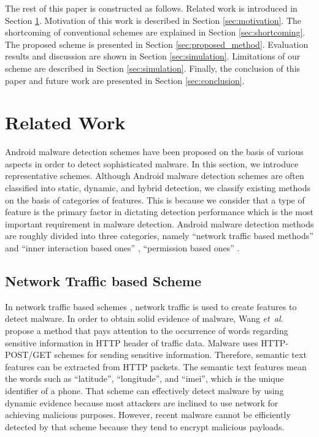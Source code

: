 \documentclass{ieeeaccess}
\newcommand{\etal}{\textit{et~al.}}
\begin{document}
The rest of this paper is constructed as follows. 
Related work is introduced in Section \ref{sec:related_work}.
Motivation of this work is described in Section \ref{sec:motivation}.
The shortcoming of conventional schemes are explained in Section \ref{sec:shortcoming}.
The proposed scheme is presented in Section \ref{sec:proposed_method}.
Evaluation results and discussion are shown in Section \ref{sec:simulation}.
Limitations of our scheme are described in Section \ref{sec:simulation}.
Finally, the conclusion of this paper and future work are presented in Section \ref{sec:conclusion}.

\section{Related Work} \label{sec:related_work}
Android malware detection schemes have been proposed on the basis of various aspects in order to detect sophisticated malware.
In this section, we introduce representative schemes.
Although Android malware detection schemes are often classified into static, dynamic, and hybrid detection, we classify existing methods on the basis of categories of features.
This is because we consider that a type of feature is the primary factor in dictating detection performance which is the most important requirement in malware detection.
Android malware detection methods are roughly divided into three categories, namely ``network traffic based methods'' \cite{wang2018detecting,garg2017network} and ``inner interaction based ones'' \cite{aafer2013droidapiminer, deshotels2014droidlegacy, xu2016iccdetector, cai2018droidcat}, ``permission based ones''  \cite{sanz2013puma, li2018significant, liang2014permission, liu2014two, arora2019permpair}.

\subsection{Network Traffic based Scheme}
In network traffic based schemes \cite{wang2018detecting,garg2017network}, network traffic is used to create features to detect malware.
In order to obtain solid evidence of malware, Wang \etal \cite{wang2018detecting} propose a method that pays attention to the occurrence of words regarding sensitive information in HTTP header of traffic data.
Malware uses HTTP-POST/GET schemes for sending sensitive information.
Therefore, semantic text features can be extracted from HTTP packets. 
The semantic text features mean the words such as ``latitude'', ``longitude'', and ``imei'', which is the unique identifier of a phone.
That scheme can effectively detect malware by using dynamic evidence because most attackers are inclined to use network for achieving malicious purposes.
However, recent malware cannot be efficiently detected by that scheme because they tend to encrypt malicious payloads.
\end{document}
